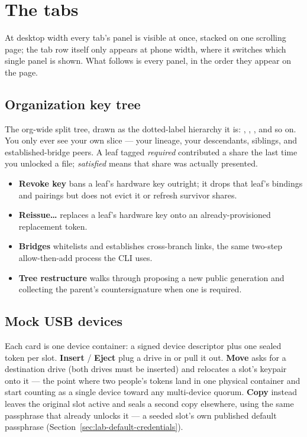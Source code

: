 \section{The tabs}

At desktop width every tab's panel is visible at once, stacked on one
scrolling page; the tab row itself only appears at phone width, where it
switches which single panel is shown. What follows is every panel, in the
order they appear on the page.

\subsection{Organization key tree}

The org-wide split tree, drawn as the dotted-label hierarchy it is:
, , , and so on. You only ever see your own
slice --- your lineage, your descendants, siblings, and established-bridge
peers. A leaf tagged \emph{required} contributed a share the last time you
unlocked a file; \emph{satisfied} means that share was actually presented.

\begin{itemize}
  \item \textbf{Revoke key} bans a leaf's hardware key outright; it drops
  that leaf's bindings and pairings but does not evict it or refresh
  survivor shares.
  \item \textbf{Reissue\ldots} replaces a leaf's hardware key onto an
  already-provisioned replacement token.
  \item \textbf{Bridges} whitelists and establishes cross-branch links, the
  same two-step allow-then-add process the CLI uses.
  \item \textbf{Tree restructure} walks through proposing a new public
  generation and collecting the parent's countersignature when one is
  required.
\end{itemize}


\subsection{Mock USB devices}

Each card is one device container: a signed device descriptor plus one
sealed token per slot. \textbf{Insert} / \textbf{Eject} plug a drive in or
pull it out. \textbf{Move} asks for a destination drive (both drives must
be inserted) and relocates a slot's keypair onto it --- the point where two
people's tokens land in one physical container and start counting as a
single device toward any multi-device quorum. \textbf{Copy} instead leaves
the original slot active and seals a second copy elsewhere, using the same
passphrase that already unlocks it --- a seeded slot's own published default
passphrase (Section~\ref{sec:lab-default-credentials}).

